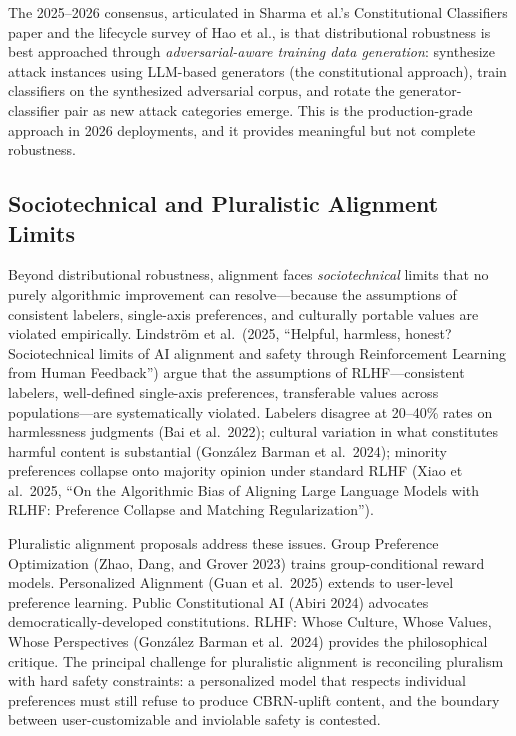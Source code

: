 The 2025--2026 consensus, articulated in Sharma et al.'s Constitutional Classifiers paper and the lifecycle survey of Hao et al., is that distributional robustness is best approached through \emph{adversarial-aware training data generation}: synthesize attack instances using LLM-based generators (the constitutional approach), train classifiers on the synthesized adversarial corpus, and rotate the generator-classifier pair as new attack categories emerge. This is the production-grade approach in 2026 deployments, and it provides meaningful but not complete robustness.

\subsection{Sociotechnical and Pluralistic Alignment Limits}\label{sociotechnical-and-pluralistic-alignment-limits}

Beyond distributional robustness, alignment faces \emph{sociotechnical} limits that no purely algorithmic improvement can resolve---because the assumptions of consistent labelers, single-axis preferences, and culturally portable values are violated empirically. Lindström et al.~(2025, ``Helpful, harmless, honest? Sociotechnical limits of AI alignment and safety through Reinforcement Learning from Human Feedback'') argue that the assumptions of RLHF---consistent labelers, well-defined single-axis preferences, transferable values across populations---are systematically violated. Labelers disagree at 20--40\% rates on harmlessness judgments (Bai et al.~2022); cultural variation in what constitutes harmful content is substantial (González Barman et al.~2024); minority preferences collapse onto majority opinion under standard RLHF (Xiao et al.~2025, ``On the Algorithmic Bias of Aligning Large Language Models with RLHF: Preference Collapse and Matching Regularization'').

Pluralistic alignment proposals address these issues. Group Preference Optimization (Zhao, Dang, and Grover 2023) trains group-conditional reward models. Personalized Alignment (Guan et al.~2025) extends to user-level preference learning. Public Constitutional AI (Abiri 2024) advocates democratically-developed constitutions. RLHF: Whose Culture, Whose Values, Whose Perspectives (González Barman et al.~2024) provides the philosophical critique. The principal challenge for pluralistic alignment is reconciling pluralism with hard safety constraints: a personalized model that respects individual preferences must still refuse to produce CBRN-uplift content, and the boundary between user-customizable and inviolable safety is contested.

